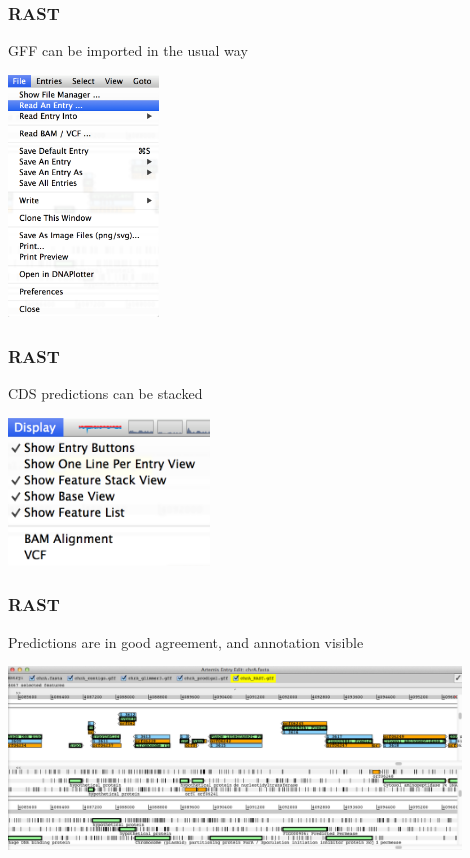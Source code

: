     \begin{frame}
      \frametitle{RAST}   
      GFF can be imported in the usual way
      \begin{center}
        \includegraphics[width=0.3\textwidth]{images/rast0} 
      \end{center}        
    \end{frame}

    \begin{frame}
      \frametitle{RAST}   
      CDS predictions can be stacked
      \begin{center}
        \includegraphics[width=0.4\textwidth]{images/rast1} 
      \end{center}        
    \end{frame}

    \begin{frame}
      \frametitle{RAST}   
      Predictions are in good agreement, and annotation visible
      \begin{center}
        \includegraphics[width=0.9\textwidth]{images/rast2} 
      \end{center}        
    \end{frame}

